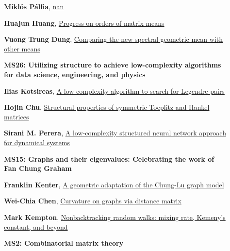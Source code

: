 \documentclass[ILAS2025-program.tex]{subfiles}
\begin{document}
\begin{description}
\begin{description}
    \item[] \hypertarget{up0132}{}\textbf{Miklós Pálfia}, \hyperlink{down0132}{nan}
        \item[] \hypertarget{up0133}{}\textbf{Huajun Huang}, \hyperlink{down0133}{Progress on orders of matrix means}
        \item[] \hypertarget{up0134}{}\textbf{Vuong Trung Dung}, \hyperlink{down0134}{Comparing the new spectral geometric mean with other means}
        \end{description}
    \begin{description}
    \item[] {\color{mstitle}\textbf{MS26: Utilizing structure to achieve low-complexity algorithms for data science, engineering, and physics}} 
    \item[] \hypertarget{up0135}{}\textbf{Ilias Kotsireas}, \hyperlink{down0135}{A low-complexity algorithm to search for Legendre pairs
}
        \item[] \hypertarget{up0136}{}\textbf{Hojin Chu}, \hyperlink{down0136}{Structural properties of symmetric Toeplitz and Hankel matrices}
        \item[] \hypertarget{up0137}{}\textbf{Sirani M. Perera}, \hyperlink{down0137}{A low-complexity structured neural network approach for dynamical systems}
        \end{description}
    \begin{description}
    \item[] {\color{mstitle}\textbf{MS15: Graphs and their eigenvalues: Celebrating the work of Fan Chung Graham}} 
    \item[] \hypertarget{up0138}{}\textbf{Franklin Kenter}, \hyperlink{down0138}{A geometric adaptation of the Chung-Lu graph model}
        \item[] \hypertarget{up0139}{}\textbf{Wei-Chia Chen}, \hyperlink{down0139}{Curvature on graphs via distance matrix}
        \item[] \hypertarget{up0140}{}\textbf{Mark Kempton}, \hyperlink{down0140}{Nonbacktracking random walks: mixing rate, Kemeny's constant, and beyond}
        \end{description}
    \begin{description}
    \item[] {\color{mstitle}\textbf{MS2: Combinatorial matrix theory}} 

\end{description}
\end{description}
\end{document}
